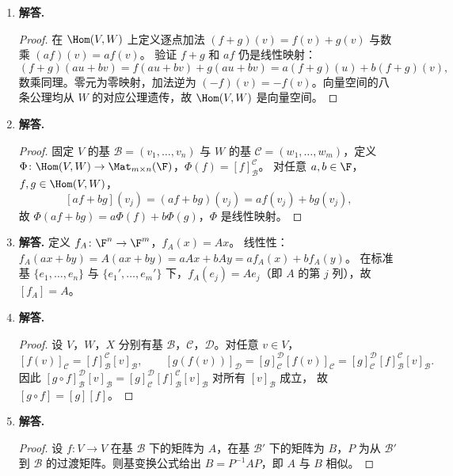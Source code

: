 \begin{enumerate}[label=\textbf{\arabic*.}, leftmargin=*, itemsep=1em]
\begin{proof}
综合两不等式得 $\rank(g\circ f)\le\min\{\rank(f),\rank(g)\}$。
\end{proof}

\item \textbf{解答.}
\begin{proof}
在 $\Hom(V,W)$ 上定义逐点加法 $(f+g)(v)=f(v)+g(v)$ 与数乘 $(af)(v)=af(v)$。
验证 $f+g$ 和 $af$ 仍是线性映射：
\[
  (f+g)(au+bv)=f(au+bv)+g(au+bv)=a(f+g)(u)+b(f+g)(v),
\]
数乘同理。零元为零映射，加法逆为 $(-f)(v)=-f(v)$。向量空间的八条公理均从 $W$ 的对应公理遗传，故 $\Hom(V,W)$ 是向量空间。
\end{proof}

\item \textbf{解答.}
\begin{proof}
固定 $V$ 的基 $\mathcal{B}=(v_1,\ldots,v_n)$ 与 $W$ 的基 $\mathcal{C}=(w_1,\ldots,w_m)$，定义 $\Phi\colon\Hom(V,W)\to\Mat_{m\times n}(\F)$，$\Phi(f)=[f]_{\mathcal{B}}^{\mathcal{C}}$。
对任意 $a,b\in\F$，$f,g\in\Hom(V,W)$，
\[
  [af+bg](v_j)=(af+bg)(v_j)=af(v_j)+bg(v_j),
\]
故 $\Phi(af+bg)=a\Phi(f)+b\Phi(g)$，$\Phi$ 是线性映射。
\end{proof}

\item \textbf{解答.}
定义 $f_A\colon\F^n\to\F^m$，$f_A(x)=Ax$。
线性性：$f_A(ax+by)=A(ax+by)=aAx+bAy=af_A(x)+bf_A(y)$。
在标准基 $\{e_1,\ldots,e_n\}$ 与 $\{e_1',\ldots,e_m'\}$ 下，$f_A(e_j)=Ae_j$（即 $A$ 的第 $j$ 列），故 $[f_A]=A$。

\item \textbf{解答.}
\begin{proof}
设 $V$，$W$，$X$ 分别有基 $\mathcal{B}$，$\mathcal{C}$，$\mathcal{D}$。对任意 $v\in V$，
\[
  [f(v)]_{\mathcal{C}}=[f]_{\mathcal{B}}^{\mathcal{C}}[v]_{\mathcal{B}},
  \qquad
  [g(f(v))]_{\mathcal{D}}=[g]_{\mathcal{C}}^{\mathcal{D}}[f(v)]_{\mathcal{C}}
  =[g]_{\mathcal{C}}^{\mathcal{D}}[f]_{\mathcal{B}}^{\mathcal{C}}[v]_{\mathcal{B}}.
\]
因此 $[g\circ f]_{\mathcal{B}}^{\mathcal{D}}[v]_{\mathcal{B}}=[g]_{\mathcal{C}}^{\mathcal{D}}[f]_{\mathcal{B}}^{\mathcal{C}}[v]_{\mathcal{B}}$ 对所有 $[v]_{\mathcal{B}}$ 成立，
故 $[g\circ f]=[g][f]$。
\end{proof}

\item \textbf{解答.}
\begin{proof}
设 $f\colon V\to V$ 在基 $\mathcal{B}$ 下的矩阵为 $A$，在基 $\mathcal{B}'$ 下的矩阵为 $B$，$P$ 为从 $\mathcal{B}'$ 到 $\mathcal{B}$ 的过渡矩阵。则基变换公式给出 $B=P^{-1}AP$，即 $A$ 与 $B$ 相似。


\end{proof}
\end{enumerate}
